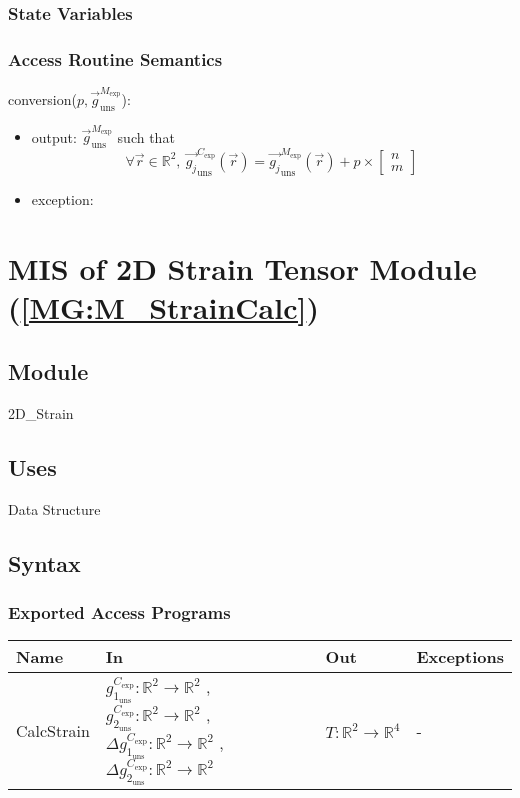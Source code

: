 \documentclass[12pt, titlepage]{article}
\begin{document}
\subsubsection{State Variables}


\subsubsection{Access Routine Semantics}

\noindent conversion($p,\overrightarrow{g}_{\text{uns}}^{M_{\text{exp}}}$):
\begin{itemize}
\item output: $\overrightarrow{g}_{\text{uns}}^{M_{\text{exp}}}$ such that
	\begin{equation*}
	\forall \vec{r} \in \mathbb{R}^2, \
	\overrightarrow{g_{j}}_{\text{uns}}^{C_{\text{exp}}}(\vec{r})= \overrightarrow{g_{j}}_{\text{uns}}^{M_{\text{exp}}}(\vec{r}) + p \times \begin{bmatrix}
	n \\
	m
	\end{bmatrix}
	\end{equation*}
\item exception:  
\end{itemize}

\section{MIS of 2D Strain Tensor Module (\texorpdfstring{\cref{MG:M_StrainCalc}}))} \label{MIS_StrainCalc}

\subsection{Module}
2D{\_}Strain
\subsection{Uses}
Data Structure
\subsection{Syntax}

\subsubsection{Exported Access Programs}

\begin{center}
\begin{tabular}{p{2cm} p{4cm} p{4cm} p{2cm}}
\hline
\textbf{Name} & \textbf{In} & \textbf{Out} & \textbf{Exceptions} \\
\hline
CalcStrain & $g_{1_{{\text{uns}}}}^{C_{\text{exp}}}:\mathbb{R}^2\rightarrow\mathbb{R}^2$ , $g_{2_{{\text{uns}}}}^{C_{\text{exp}}}:\mathbb{R}^2\rightarrow\mathbb{R}^2$ , $\Delta g_{1_{{\text{uns}}}}^{C_{\text{exp}}}:\mathbb{R}^2\rightarrow\mathbb{R}^2$ , $\Delta g_{2_{{\text{uns}}}}^{C_{\text{exp}}}:\mathbb{R}^2\rightarrow\mathbb{R}^2$  & $T:\mathbb{R}^2\rightarrow\mathbb{R}^4$ & - \\
\hline
\end{tabular}
\end{center}
\end{document}
